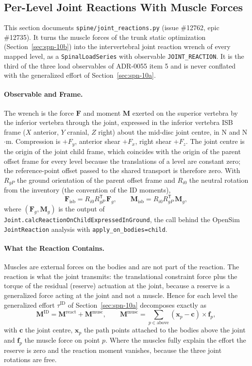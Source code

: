 \subsection{Per-Level Joint Reactions With Muscle Forces}
\label{sec:spn-10c}

This section documents \texttt{spine/joint\_reactions.py} (issue \#12762, epic
\#12735). It turns the muscle forces of the trunk static optimization
(Section~\ref{sec:spn-10b}) into the intervertebral joint reaction wrench of
every mapped level, as a \texttt{SpinalLoadSeries} with observable
\texttt{JOINT\_REACTION}. It is the third of the three load observables of
ADR-0055 item 5 and is never conflated with the generalized effort of
Section~\ref{sec:spn-10a}.

\paragraph{Observable and Frame.}
The wrench is the force $\mathbf F$ and moment $\mathbf M$ exerted on the
superior vertebra by the inferior vertebra through the joint, expressed in the
inferior vertebra ISB frame ($X$ anterior, $Y$ cranial, $Z$ right) about the
mid-disc joint centre, in N and N$\cdot$m. Compression is $+F_y$, anterior
shear $+F_x$, right shear $+F_z$. The joint centre is the origin of the joint
child frame, which coincides with the origin of the parent offset frame for
every level because the translations of a level are constant zero; the
reference-point offset passed to the shared transport is therefore zero. With
$R_{gP}$ the ground orientation of the parent offset frame and $R_{i0}$ the
neutral rotation from the inventory (the convention of the ID moments),
\[
  \mathbf F_{\mathrm{isb}} = R_{i0} R_{gP}^{\mathsf T}\,\mathbf F_g , \qquad
  \mathbf M_{\mathrm{isb}} = R_{i0} R_{gP}^{\mathsf T}\,\mathbf M_g ,
\]
where $(\mathbf F_g,\mathbf M_g)$ is the output of
\texttt{Joint.calcReactionOnChildExpressedInGround}, the call behind the
OpenSim \texttt{JointReaction} analysis with \texttt{apply\_on\_bodies=child}.

\paragraph{What the Reaction Contains.}
Muscles are external forces on the bodies and are not part of the reaction.
The reaction is what the joint transmits: the translational constraint force
plus the torque of the residual (reserve) actuation at the joint, because a
reserve is a generalized force acting at the joint and not a muscle. Hence for
each level the generalized effort $\tau^{\mathrm{ID}}$ of
Section~\ref{sec:spn-10a} decomposes exactly as
\[
  \mathbf M^{\mathrm{ID}} = \mathbf M^{\mathrm{react}} + \mathbf M^{\mathrm{musc}},
  \qquad
  \mathbf M^{\mathrm{musc}} = \sum_{p\in\text{above}} (\mathbf x_p - \mathbf c)
  \times \mathbf f_p ,
\]
with $\mathbf c$ the joint centre, $\mathbf x_p$ the path points attached to the
bodies above the joint and $\mathbf f_p$ the muscle force on point $p$. Where
the muscles fully explain the effort the reserve is zero and the reaction
moment vanishes, because the three joint rotations are free.

